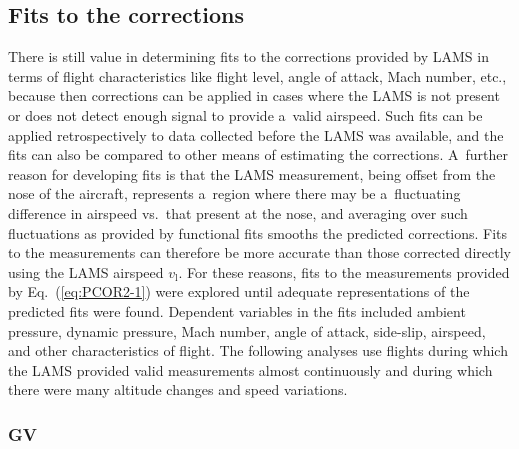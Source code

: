 \documentclass[amtd, online, hvmath]{copernicus}
\begin{document}
\subsection{Fits to the corrections}\label{sub:Determining-the-Corrections-1}

There is still value in determining fits to the corrections provided
by LAMS in terms of flight characteristics like flight level, angle of
attack, Mach number, etc., because then corrections can be applied in
cases where the LAMS is not present or does not detect enough signal
to provide a~valid airspeed. Such fits can be applied retrospectively
to data collected before the LAMS was available, and the fits can also
be compared to other means of estimating the corrections. A~further
reason for developing fits is that the LAMS measurement, being offset
from the nose of the aircraft, represents a~region where there may be
a~fluctuating difference in airspeed vs.~that present at the nose, and
averaging over such fluctuations as provided by functional fits
smooths the predicted corrections. Fits to the measurements can
therefore be more accurate than those corrected directly using the
LAMS airspeed $v_{\mathrm{l}}$. For these reasons, fits to the
measurements provided by Eq.~(\ref{eq:PCOR2-1}) were explored until
adequate representations of the predicted fits were found. Dependent
variables in the fits included ambient pressure, dynamic pressure,
Mach number, angle of attack, side-slip, airspeed, and other
characteristics of flight.  The following analyses use flights during
which the LAMS provided valid measurements almost continuously and
during which there were many altitude changes and speed variations.

\subsubsection{GV}
\end{document}
